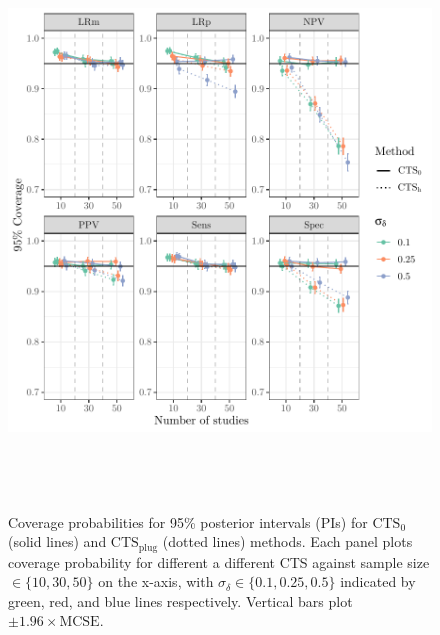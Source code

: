 \documentclass[AMA,STIX1COL]{WileyNJD-v2}
\newcommand{\CTSo}{\text{CTS}_0}
\newcommand{\CTSp}{\text{CTS}_{\text{plug}}}
\begin{document}
\begin{figure}
\includegraphics[height = 6in, width = 6in]{cover_plot.pdf}
\caption{Coverage probabilities for 95\% posterior intervals (PIs) for $\CTSo$ (solid lines) and $\CTSp$ (dotted lines) methods. Each panel plots coverage probability for different a different CTS against sample size $\in \{10, 30, 50\}$ on the x-axis, with $\sigma_{\delta} \in \{0.1, 0.25, 0.5\}$ indicated by green, red, and blue lines respectively. Vertical bars plot $\pm 1.96 \times \text{MCSE}$.}
\label{fig:cts_coverage}
\end{figure}
\end{document}
